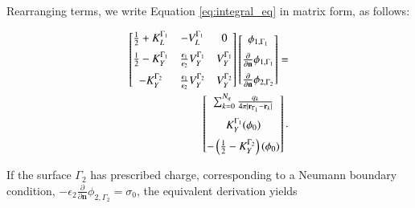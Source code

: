 \noindent Rearranging terms, we write Equation \eqref{eq:integral_eq} in matrix form, as follows:

 \begin{align} \label{eq:matrix_phi}
 \left[
    \begin{matrix} %
       \frac{1}{2} + K_{L}^{\Gamma_1} & -V_{L}^{\Gamma_1} & 0 \vspace{0.2cm}\\
       \frac{1}{2} - K_{Y}^{\Gamma_1} &  \frac{\epsilon_1}{\epsilon_2} V_{Y}^{\Gamma_1} & V_{Y}^{\Gamma_1} \vspace{0.2cm} \\
       - K_{Y}^{\Gamma_2} & \frac{\epsilon_1}{\epsilon_2} V_{Y}^{\Gamma_2} & V_{Y}^{\Gamma_2} \\
    \end{matrix}
    \right] \left[ 
    \begin{matrix} %
       \phi_{1,\Gamma_1} \vspace{0.2cm} \\
       \frac{\partial}{\partial \mathbf{n}} \phi_{1,\Gamma_1} \vspace{0.2cm}\\
       \frac{\partial}{\partial \mathbf{n}} \phi_{2,\Gamma_2}\\
    \end{matrix} 
     \right] =  & \nonumber \\
    \left[
    \begin{matrix} %
       \sum_{k=0}^{N_q} \frac{q_k}{4\pi|\mathbf{r}_{\Gamma_1} - \mathbf{r}_k|} \vspace{0.2cm} \\
        K_{Y}^{\Gamma_1}(\phi_{0}) \vspace{0.2cm} \\
        -\left(\frac{1}{2} - K_{Y}^{\Gamma_2}\right) (\phi_0)
    \end{matrix}
    \right].
 \end{align}

\medskip
\noindent If the surface $\Gamma_2$ has prescribed charge, corresponding to a Neumann boundary condition, $-\epsilon_2\frac{\partial}{\partial \mathbf{n}} \phi_{2,\Gamma_2} = \sigma_0$, the equivalent derivation yields

